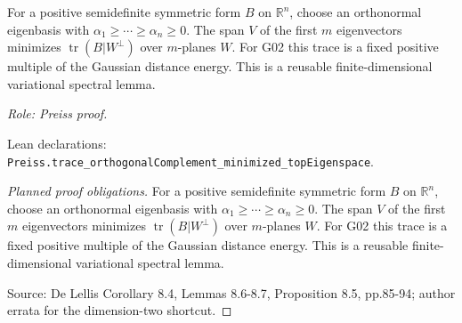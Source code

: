 \begin{lemma}
\label{lem:spectral-minimizing-plane}




For a positive semidefinite symmetric form $B$ on $\mathbb R^n$, choose an
orthonormal eigenbasis with $\alpha_1\geq\cdots\geq\alpha_n\geq0$.
The span $V$ of the first $m$ eigenvectors minimizes
$\operatorname{tr}(B|W^\perp)$ over $m$-planes $W$.
For G02 this trace is a fixed positive multiple of the Gaussian distance
energy. This is a reusable finite-dimensional variational spectral lemma.
\par\emph{Role: Preiss proof.}
\par Lean declarations: \texttt{Preiss.trace\_orthogonalComplement\_minimized\_topEigenspace}.
\end{lemma}
\begin{proof}[Planned proof obligations]
For a positive semidefinite symmetric form $B$ on $\mathbb R^n$, choose an
orthonormal eigenbasis with $\alpha_1\geq\cdots\geq\alpha_n\geq0$.
The span $V$ of the first $m$ eigenvectors minimizes
$\operatorname{tr}(B|W^\perp)$ over $m$-planes $W$.
For G02 this trace is a fixed positive multiple of the Gaussian distance
energy. This is a reusable finite-dimensional variational spectral lemma.
\par Source: De Lellis Corollary 8.4, Lemmas 8.6-8.7, Proposition 8.5, pp.85-94; author errata for the dimension-two shortcut.
\end{proof}

